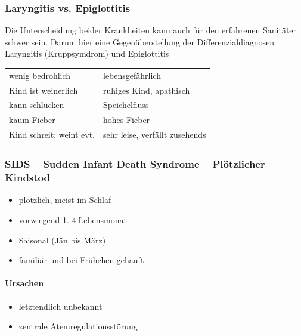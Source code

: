  \subsubsection{Laryngitis vs. Epiglottitis}
 
Die Unterscheidung beider Krankheiten kann auch für den erfahrenen Sanitäter schwer sein. Darum hier eine Gegenüberstellung der Differenzialdiagnosen Laryngitis (Kruppsymdrom) und Epiglottitis

 \begin{center}
\begin{tabulary}{12cm}{LL}\toprule
{}
&
\\\midrule
wenig bedrohlich
&
lebensgefährlich
\\\addlinespace
Kind ist weinerlich
&
ruhiges Kind, apathisch
\\\addlinespace
kann schlucken
&
Speichelfluss
\\\addlinespace
kaum Fieber
&
hohes Fieber
\\\addlinespace
Kind schreit; weint evt.
&
sehr leise, verfällt zusehends
\\\bottomrule
\end{tabulary}
\end{center}
 
 
\subsubsection{SIDS -- Sudden Infant Death Syndrome -- Plötzlicher Kindstod}

\begin{itemize}
    \item plötzlich, meist im Schlaf
    \item vorwiegend 1.-4.Lebensmonat
    \item Saisonal (Jän bis März)
    \item familiär und bei Frühchen gehäuft
\end{itemize}

\paragraph{Ursachen}

\begin{itemize}
    \item letztendlich unbekannt
    \item zentrale Atemregulationsstörung 
\end{itemize}

